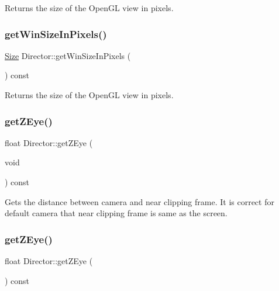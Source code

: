 Returns the size of the Open\+GL view in pixels. \mbox{\label{classDirector_a2afa5db94fce20cd07c9f4fe57708e21}} 
\subsubsection{\texorpdfstring{get\+Win\+Size\+In\+Pixels()}{getWinSizeInPixels()}\hspace{0.1cm}{\footnotesize\ttfamily [2/2]}}
{\footnotesize\ttfamily \hyperlink{classSize}{Size} Director\+::get\+Win\+Size\+In\+Pixels (\begin{DoxyParamCaption}{ }\end{DoxyParamCaption}) const}

Returns the size of the Open\+GL view in pixels. \mbox{\label{classDirector_ad245779e1e70b0195e761afc0582b1da}} 
\subsubsection{\texorpdfstring{get\+Z\+Eye()}{getZEye()}\hspace{0.1cm}{\footnotesize\ttfamily [1/2]}}
{\footnotesize\ttfamily float Director\+::get\+Z\+Eye (\begin{DoxyParamCaption}\item[{void}]{ }\end{DoxyParamCaption}) const}

Gets the distance between camera and near clipping frame. It is correct for default camera that near clipping frame is same as the screen. \mbox{\label{classDirector_ad245779e1e70b0195e761afc0582b1da}} 
\subsubsection{\texorpdfstring{get\+Z\+Eye()}{getZEye()}\hspace{0.1cm}{\footnotesize\ttfamily [2/2]}}
{\footnotesize\ttfamily float Director\+::get\+Z\+Eye (\begin{DoxyParamCaption}{ }\end{DoxyParamCaption}) const}

